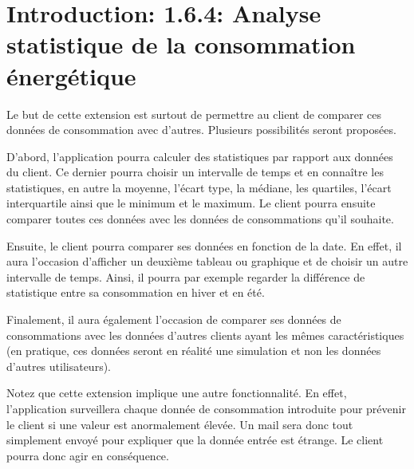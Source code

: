 \section{Introduction: 1.6.4: Analyse statistique de la consommation énergétique}

\begin{flushleft}
Le but de cette extension est surtout de permettre au client de comparer ces données de consommation avec d'autres. Plusieurs possibilités seront proposées.
\end{flushleft}

\begin{flushleft}
D'abord, l'application pourra calculer des statistiques par rapport aux données du client. Ce dernier pourra choisir un intervalle de temps et en connaître les statistiques, en autre la moyenne, l'écart type, la médiane, les quartiles, l'écart interquartile ainsi que le minimum et le maximum. Le client pourra ensuite comparer toutes ces données avec les données de consommations qu'il souhaite.
\end{flushleft}

\begin{flushleft}
Ensuite, le client pourra comparer ses données en fonction de la date. En effet, il aura l'occasion d'afficher un deuxième tableau ou graphique et de choisir un autre intervalle de temps. Ainsi, il pourra par exemple regarder la différence de statistique entre sa consommation en hiver et en été.
\end{flushleft}

\begin{flushleft}
Finalement, il aura également l'occasion de comparer ses données de consommations avec les données d'autres clients ayant les mêmes caractéristiques (en pratique, ces données seront en réalité une simulation et non les données d'autres utilisateurs).
\end{flushleft}

\begin{flushleft}
Notez que cette extension implique une autre fonctionnalité. En effet, l'application surveillera chaque donnée de consommation introduite pour prévenir le client si une valeur est anormalement élevée. Un mail sera donc tout simplement envoyé pour expliquer que la donnée entrée est étrange. Le client pourra donc agir en conséquence.
\end{flushleft}
